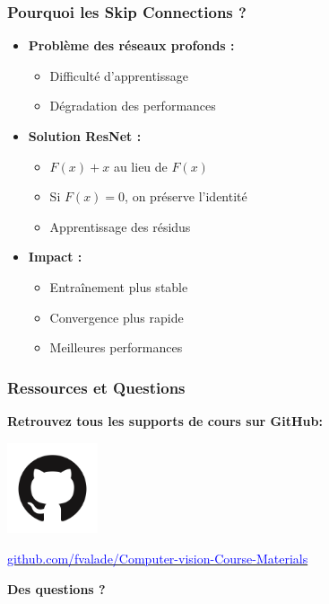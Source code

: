 \documentclass{beamer}
\begin{document}
\begin{frame}
    \frametitle{Pourquoi les Skip Connections ?}
    \begin{itemize}
        \item \textbf{Problème des réseaux profonds :}
        \begin{itemize}
            \item Difficulté d'apprentissage
            \item Dégradation des performances
        \end{itemize}
        \item \textbf{Solution ResNet :}
        \begin{itemize}
            \item \(F(x) + x\) au lieu de \(F(x)\)
            \item Si \(F(x) = 0\), on préserve l'identité
            \item Apprentissage des résidus
        \end{itemize}
        \item \textbf{Impact :}
        \begin{itemize}
            \item Entraînement plus stable
            \item Convergence plus rapide
            \item Meilleures performances
        \end{itemize}
    \end{itemize}
\end{frame}


\begin{frame}
    \frametitle{Ressources et Questions}
    \begin{center}
        \textbf{\large{Retrouvez tous les supports de cours sur GitHub: }}
        
        \vspace{0.5cm}
        \includegraphics[width=0.2\textwidth]{images/github.png}
                \begin{tcolorbox}[colback=black!5!white,colframe=black!75!white,width=0.8\textwidth]
            \centering
            \large{\href{https://github.com/fvalade/Computer-vision-Course-Materials}{\textcolor{blue}{github.com/fvalade/Computer-vision-Course-Materials}}}
        \end{tcolorbox}
        
        \huge{\textbf{Des questions ?}}
    \end{center}
\end{frame}
\end{document}
